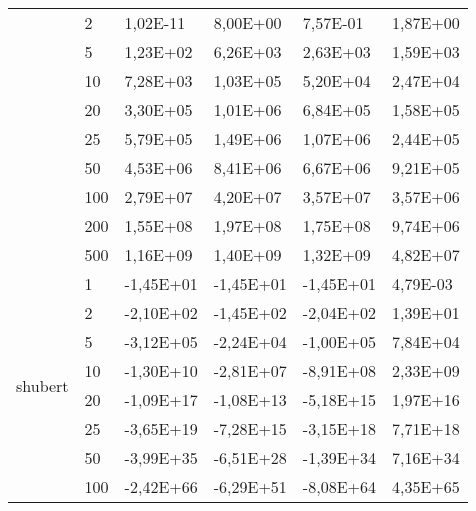 \begin{longtable}[c]{|m{3.5cm}|l|l|l|l|l|}
                                        & 2         & 1,02E-11   & 8,00E+00   & 7,57E-01   & 1,87E+00  \\ \cline{2-6} 
                                        & 5         & 1,23E+02   & 6,26E+03   & 2,63E+03   & 1,59E+03  \\ \cline{2-6} 
                                        & 10        & 7,28E+03   & 1,03E+05   & 5,20E+04   & 2,47E+04  \\ \cline{2-6} 
                                        & 20        & 3,30E+05   & 1,01E+06   & 6,84E+05   & 1,58E+05  \\ \cline{2-6} 
                                        & 25        & 5,79E+05   & 1,49E+06   & 1,07E+06   & 2,44E+05  \\ \cline{2-6} 
                                        & 50        & 4,53E+06   & 8,41E+06   & 6,67E+06   & 9,21E+05  \\ \cline{2-6} 
                                        & 100       & 2,79E+07   & 4,20E+07   & 3,57E+07   & 3,57E+06  \\ \cline{2-6} 
                                        & 200       & 1,55E+08   & 1,97E+08   & 1,75E+08   & 9,74E+06  \\ \cline{2-6} 
                                        & 500       & 1,16E+09   & 1,40E+09   & 1,32E+09   & 4,82E+07  \\ \hline
\multirow{10}{*}{shubert}               & 1         & -1,45E+01  & -1,45E+01  & -1,45E+01  & 4,79E-03  \\ \cline{2-6} 
                                        & 2         & -2,10E+02  & -1,45E+02  & -2,04E+02  & 1,39E+01  \\ \cline{2-6} 
                                        & 5         & -3,12E+05  & -2,24E+04  & -1,00E+05  & 7,84E+04  \\ \cline{2-6} 
                                        & 10        & -1,30E+10  & -2,81E+07  & -8,91E+08  & 2,33E+09  \\ \cline{2-6} 
                                        & 20        & -1,09E+17  & -1,08E+13  & -5,18E+15  & 1,97E+16  \\ \cline{2-6} 
                                        & 25        & -3,65E+19  & -7,28E+15  & -3,15E+18  & 7,71E+18  \\ \cline{2-6} 
                                        & 50        & -3,99E+35  & -6,51E+28  & -1,39E+34  & 7,16E+34  \\ \cline{2-6} 
                                        & 100       & -2,42E+66  & -6,29E+51  & -8,08E+64  & 4,35E+65  \\ \cline{2-6} 

\end{longtable}
